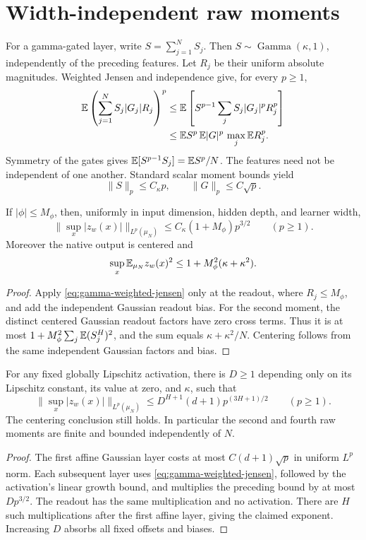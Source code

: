 \section{Width-independent raw moments}
\label{sec:raw-moments}
For a gamma-gated layer, write $S=\sum_{j=1}^NS_j$. Then
$S\sim\operatorname{Gamma}(\kappa,1)$, independently of the preceding
features. Let $R_j$ be their uniform absolute magnitudes. Weighted
Jensen and independence give, for every $p\ge1$,
\begin{align}
 \mathbb E\left(\sum_{j=1}^NS_j|G_j|R_j\right)^p
 &\le\mathbb E\left[S^{p-1}\sum_jS_j|G_j|^pR_j^p\right]\notag\\
 &\le\mathbb E S^p\,\mathbb E|G|^p\,\max_j\mathbb E R_j^p.
 \label{eq:gamma-weighted-jensen}
\end{align}
Symmetry of the gates gives
$\mathbb E[S^{p-1}S_j]=\mathbb E S^p/N$. The features need not be independent
of one another. Standard scalar moment bounds yield
\[
 \|S\|_p\le C_\kappa p,\qquad\|G\|_p\le C\sqrt p.
\]

\begin{lemma}
\label{lem:bounded-raw-moments}
If $|\phi|\le M_\phi$, then, uniformly in input dimension, hidden
depth, and learner width,
\[
 \|\sup_x|z_w(x)|\|_{L^p(\mu_N)}
       \le C_\kappa(1+M_\phi)p^{3/2}\qquad(p\ge1).
\]
Moreover the native output is centered and
\[
 \sup_x\mathbb E_{\mu_N}z_w(x)^2
 \le1+M_\phi^2(\kappa+\kappa^2).
\]
\end{lemma}
\begin{proof}
Apply \eqref{eq:gamma-weighted-jensen} only at the readout, where
$R_j\le M_\phi$, and add the independent Gaussian readout bias.
For the second moment, the distinct centered Gaussian readout factors
have zero cross terms. Thus it is at most
$1+M_\phi^2\sum_j\mathbb E(S_j^H)^2$, and the sum equals
$\kappa+\kappa^2/N$. Centering follows from the same independent
Gaussian factors and bias.
\end{proof}

\begin{lemma}
\label{lem:lipschitz-raw-moments}
For any fixed globally Lipschitz activation, there is $D\ge1$ depending
only on its Lipschitz constant, its value at zero, and $\kappa$, such that
\[
 \|\sup_x|z_w(x)|\|_{L^p(\mu_N)}
 \le D^{H+1}(d+1)p^{(3H+1)/2}\qquad(p\ge1).
\]
The centering conclusion still holds. In particular the second and
fourth raw moments are finite and bounded independently of $N$.
\end{lemma}
\begin{proof}
The first affine Gaussian layer costs at most
$C(d+1)\sqrt p$ in uniform $L^p$ norm. Each subsequent layer uses
\eqref{eq:gamma-weighted-jensen}, followed by the activation's linear
growth bound, and multiplies the preceding bound by at most $Dp^{3/2}$.
The readout has the same multiplication and no activation. There are
$H$ such multiplications after the first affine layer, giving the
claimed exponent. Increasing $D$ absorbs all fixed offsets and biases.
\end{proof}

